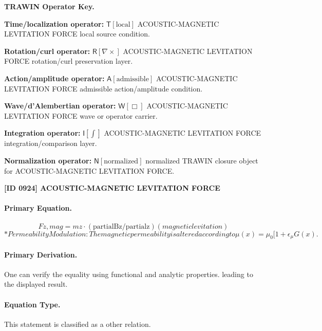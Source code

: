 \par\vspace{0.45\baselineskip}
\noindent\begin{minipage}[t]{\linewidth}
\begingroup
\small
\raggedright
\textbf{TRAWIN Operator Key.}\par
\noindent\textbf{Time/localization operator:} $\mathsf{T}\!\left[\mathrm{local}\right]$ ACOUSTIC-MAGNETIC LEVITATION FORCE local source condition.\par
\noindent\textbf{Rotation/curl operator:} $\mathsf{R}\!\left[\nabla\times\right]$ ACOUSTIC-MAGNETIC LEVITATION FORCE rotation/curl preservation layer.\par
\noindent\textbf{Action/amplitude operator:} $\mathsf{A}\!\left[\mathrm{admissible}\right]$ ACOUSTIC-MAGNETIC LEVITATION FORCE admissible action/amplitude condition.\par
\noindent\textbf{Wave/d'Alembertian operator:} $\mathsf{W}\!\left[\Box\right]$ ACOUSTIC-MAGNETIC LEVITATION FORCE wave or operator carrier.\par
\noindent\textbf{Integration operator:} $\mathsf{I}\!\left[\int\right]$ ACOUSTIC-MAGNETIC LEVITATION FORCE integration/comparison layer.\par
\noindent\textbf{Normalization operator:} $\mathsf{N}\!\left[\mathrm{normalized}\right]$ normalized TRAWIN closure object for ACOUSTIC-MAGNETIC LEVITATION FORCE.\par
\endgroup
\end{minipage}

\clearpage
\noindent\textbf{[ID 0924] ACOUSTIC-MAGNETIC LEVITATION FORCE}\par
\vspace{0.35em}
\paragraph{Primary Equation.}
\[
Fz,mag = mz\cdot(\mathrm{partialBz}/\mathrm{partialz}) (magnetic levitation)
\]
\[
* Permeability Modulation: The magnetic permeability is altered according to \mu(x) = \mu_0 [1 + \epsilon_\mu G(x) .
\]

\paragraph{Primary Derivation.}
One can verify the equality using functional and analytic properties. leading to the displayed result.
\paragraph{Equation Type.}
This statement is classified as a other relation.

